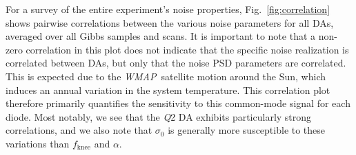 \documentclass[twocolumn]{../../common/aa}
\def\WMAP{\emph{WMAP}}
\newcommand{\Q}[0]{\textit Q}
\begin{document}
For a survey of the entire experiment's noise properties, Fig.~\ref{fig:correlation} shows pairwise correlations between the various noise parameters for all DAs, averaged over all Gibbs samples and scans. It is important to note that a non-zero correlation in this plot does not indicate that the specific noise realization is correlated between DAs, but only that the noise PSD parameters are correlated. This is expected due to the \WMAP\ satellite motion around the Sun, which induces an annual variation in the system temperature. This correlation plot therefore primarily quantifies the sensitivity to this common-mode signal for each diode. Most notably, we see that the \Q2 DA exhibits particularly strong correlations, and we also note that $\sigma_0$ is generally more susceptible to these variations than $f_{\mathrm{knee}}$ and $\alpha$. 
\end{document}
